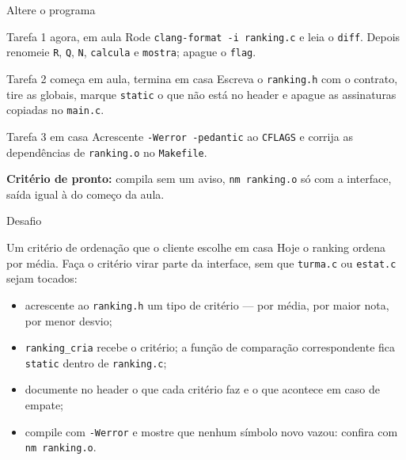 \documentclass[aspectratio=169]{beamer}
\begin{document}
\begin{frame}{Altere o programa}
  \small
  \begin{block}{Tarefa 1 \hfill \normalfont\scriptsize agora, em aula}
    Rode \texttt{clang-format -i ranking.c} e leia o \texttt{diff}. Depois
    renomeie \texttt{R}, \texttt{Q}, \texttt{N}, \texttt{calcula} e
    \texttt{mostra}; apague o \texttt{flag}.
  \end{block}
  \begin{block}{Tarefa 2 \hfill \normalfont\scriptsize começa em aula, termina em casa}
    Escreva o \texttt{ranking.h} com o contrato, tire as globais, marque
    \texttt{static} o que não está no header e apague as assinaturas
    copiadas no \texttt{main.c}.
  \end{block}
  \begin{block}{Tarefa 3 \hfill \normalfont\scriptsize em casa}
    Acrescente \texttt{-Werror -pedantic} ao \texttt{CFLAGS} e corrija as
    dependências de \texttt{ranking.o} no \texttt{Makefile}.
  \end{block}
  \begin{center}
    \scriptsize\textbf{Critério de pronto:} compila sem um aviso, \texttt{nm
    ranking.o} só com a interface, saída igual à do começo da aula.
  \end{center}
\end{frame}

\begin{frame}{Desafio}
  \begin{block}{Um critério de ordenação que o cliente escolhe
      \hfill \normalfont\scriptsize em casa}
    Hoje o ranking ordena por média. Faça o critério virar parte da
    interface, sem que \texttt{turma.c} ou \texttt{estat.c} sejam tocados:
    \begin{itemize}
      \item acrescente ao \texttt{ranking.h} um tipo de critério ---
        por média, por maior nota, por menor desvio;
      \item \texttt{ranking\_cria} recebe o critério; a função de comparação
        correspondente fica \texttt{static} dentro de \texttt{ranking.c};
      \item documente no header o que cada critério faz e o que acontece em
        caso de empate;
      \item compile com \texttt{-Werror} e mostre que nenhum símbolo novo
        vazou: confira com \texttt{nm ranking.o}.
    \end{itemize}
  \end{block}
\end{frame}
\end{document}
